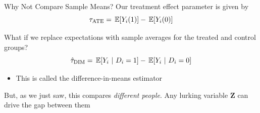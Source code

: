 \documentclass[aspectratio=169,t,11pt,table]{beamer}
\begin{document}
\begin{frame}{Why Not Compare Sample Means?}
  Our treatment effect parameter is given by 
  $$
    \tau_{\text{ATE}} = \expec{Y_{i}(1)} - \expec{Y_{i}(0)}
  $$
  
  \bigskip
  What if we replace expectations with sample averages for the treated and control groups?
  $$
    \hat{\tau}_{\text{DIM}} = \expec{Y_{i}}{D_i = 1} - \expec{Y_{i}}{D_i = 0}
  $$
  \begin{itemize}
    \item This is called the \alert{difference-in-means estimator}
  \end{itemize}

  \pause
  \bigskip
  But, as we just saw, this compares \emph{different people}. Any lurking variable $\bm{Z}$ can drive the gap between them
\end{frame}

% 
% 
% 
%   
\end{document}
